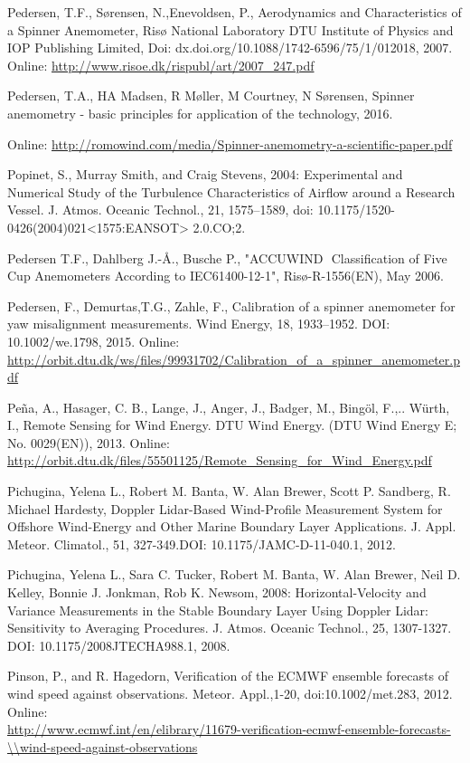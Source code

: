 Pedersen, T.F., Sørensen, N.,Enevoldsen, P., Aerodynamics and Characteristics of a Spinner Anemometer, Risø National Laboratory DTU Institute of Physics and IOP Publishing Limited, Doi: dx.doi.org/10.1088/1742-6596/75/1/012018, 2007. 
Online: \small{\url{http://www.risoe.dk/rispubl/art/2007_247.pdf}}


Pedersen, T.A., HA Madsen, R Møller, M Courtney, N Sørensen, Spinner anemometry - basic principles for application of the technology, 2016. 

Online: \small{\url{http://romowind.com/media/Spinner-anemometry-a-scientific-paper.pdf}}


Popinet, S., Murray Smith, and Craig Stevens, 2004: Experimental and Numerical Study of the Turbulence Characteristics of Airflow around a Research Vessel. J. Atmos. Oceanic Technol., 21, 1575–1589, doi: 10.1175/1520-0426(2004)021<1575:EANSOT> 2.0.CO;2.                                                                 

Pedersen T.F., Dahlberg J.-Å., Busche P., "ACCUWIND ­ Classification of Five Cup Anemometers According to IEC61400-12-1", Risø-R-1556(EN), May 2006.


Pedersen, F., Demurtas,T.G., Zahle, F., Calibration of a spinner anemometer for yaw misalignment measurements. Wind Energy, 18, 1933–1952. DOI: 10.1002/we.1798, 2015.
Online: \small{\url{http://orbit.dtu.dk/ws/files/99931702/Calibration_of_a_spinner_anemometer.pdf}}


Pe{\~n}a, A., Hasager, C. B., Lange, J., Anger, J., Badger, M., Bing{\"o}l, F.,.. Würth, I., Remote Sensing for Wind Energy. DTU Wind Energy.  (DTU Wind Energy E; No. 0029(EN)), 2013. Online: \small{\url{http://orbit.dtu.dk/files/55501125/Remote_Sensing_for_Wind_Energy.pdf}}


Pichugina, Yelena L., Robert M. Banta, W. Alan Brewer, Scott P. Sandberg, R. Michael Hardesty, Doppler Lidar-Based Wind-Profile Measurement System for Offshore Wind-Energy and Other Marine Boundary Layer Applications. J. Appl. Meteor. Climatol., 51, 327-349.DOI: 10.1175/JAMC-D-11-040.1, 2012.


Pichugina, Yelena L., Sara C. Tucker, Robert M. Banta, W. Alan Brewer, Neil D. Kelley, Bonnie J. Jonkman, Rob K. Newsom, 2008: Horizontal-Velocity and Variance Measurements in the Stable Boundary Layer Using Doppler Lidar: Sensitivity to Averaging Procedures. J. Atmos. Oceanic Technol., 25, 1307-1327. DOI: 10.1175/2008JTECHA988.1, 2008.


Pinson, P., and R. Hagedorn, Verification of the ECMWF ensemble forecasts of wind speed against observations. Meteor. Appl.,1-20, doi:10.1002/met.283, 2012. Online:\\\small{\url{http://www.ecmwf.int/en/elibrary/11679-verification-ecmwf-ensemble-forecasts-\\wind-speed-against-observations}}


